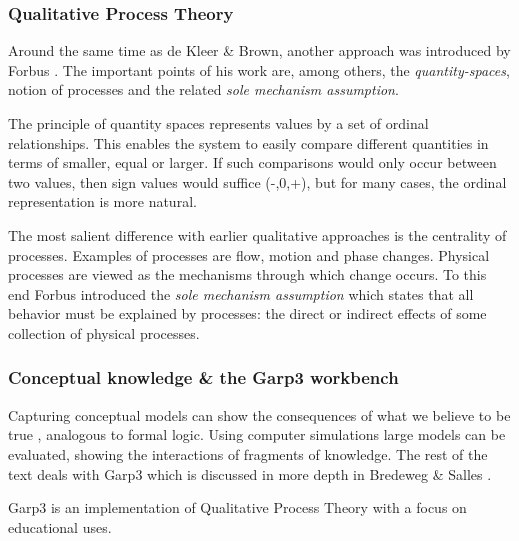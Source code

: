 \documentclass{article} %
\begin{document}
\subsubsection{Qualitative Process Theory}
\label{sec:litrev_qr_forbus}

Around the same time as de Kleer \& Brown, another approach was introduced by
Forbus \cite{forbus}. The important points of his work are, among others, 
the \emph{quantity-spaces}, notion of processes and the related
\emph{sole mechanism assumption}.

The principle of quantity spaces represents values by a set of ordinal
relationships. This enables the system to easily compare different
quantities in terms of smaller, equal or larger. If such comparisons would
only occur between two values, then sign values would suffice (-,0,+), but for
many cases, the ordinal representation is more natural.

The most salient difference with earlier qualitative approaches is the
centrality of processes. Examples of processes are flow, motion and phase
changes.  Physical processes are viewed as the mechanisms through which change
occurs. To this end Forbus introduced the \emph{sole mechanism assumption}
which states that all behavior must be explained by processes: the direct or
indirect effects of some collection of physical processes. 


\subsubsection{Conceptual knowledge \& the Garp3 workbench}
\label{sec:litrev_qr_garp}

Capturing conceptual models can show the consequences of what we believe to be
true \cite{bredeweg-eco}, analogous to formal logic. Using computer simulations
large models can be evaluated, showing the interactions of fragments of
knowledge. The rest of the text \cite{bredeweg-eco} deals with Garp3 which is
discussed in more depth in Bredeweg \& Salles \cite{bredeweg-garp}.

Garp3\cite{bredeweg-garp} is an implementation of Qualitative Process Theory with a focus on
educational uses.
\end{document}
